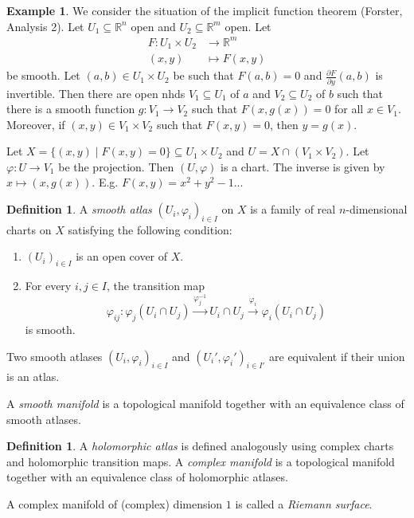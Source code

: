 \documentclass[11pt,A4]{article}
\theoremstyle{plain}
\theoremstyle{definition}
\newtheorem{defn}[thm]{Definition}
\newtheorem{exa}[thm]{Example}
\theoremstyle{remark}
\newcommand{\R}{\mathbb{R}}
\newcommand{\1}{\mathbbm{1}}
\newcommand{\tms}{\times}
\begin{document}
\begin{exa}
    We consider the situation of the implicit function theorem (Forster, Analysis 2).
    Let $U_{1}\subseteq \R^{n}$ open and $U_{2}\subseteq \R^{m}$ open.
    Let
    \begin{align*}
	F\colon U_{1}\times U_{2} &\to \R^{m} \\
	(x,y) &\mapsto F(x,y)
    \end{align*}
    be smooth.
    Let $(a,b)\in U_{1}\times U_{2}$ be such that $F(a,b)=0$ and $\frac{\partial F}{\partial y}(a,b)$ is invertible.
    Then there are open nhds $V_{1}\subseteq U_{1}$ of $a$ and $V_{2}\subseteq U_{2}$ of $b$ such that there is a smooth function $g\colon V_{1}\to V_{2}$ such that $F(x,g(x))=0$ for all $x\in V_{1}$.
    Moreover, if $(x,y)\in V_{1}\times V_{2}$ such that $F(x,y)=0$, then $y=g(x)$.

    Let $X=\{(x,y)\mid F(x,y)=0\} \subseteq U_{1}\times U_{2}$ and $U=X\cap (V_{1}\tms V_{2})$.
    Let $\varphi \colon U\to V_{1}$ be the projection.
    Then $(U,\varphi)$ is a chart.
    The inverse is given by $x\mapsto (x,g(x))$.
    E.g. $F(x,y)=x^{2}+y^{2}-1$...
\end{exa}

\begin{defn}
    A \textit{smooth atlas} $(U_{i},\varphi_{i})_{i\in I}$ on $X$ is a family of real $n$-dimensional charts on $X$ satisfying the following condition:
    \begin{enumerate}[label=\arabic*)]
	\item $(U_{i})_{i\in I}$ is an open cover of $X$.
	\item For every $i,j\in I$, the transition map
	    \[\varphi_{ij}\colon \varphi_{j}(U_{i}\cap U_{j})\xrightarrow{\varphi_{j}^{-1}} U_{i}\cap U_{j}\xrightarrow{\varphi_{i}} \varphi_{i}(U_{i}\cap U_{j}) \]
	    is smooth.
    \end{enumerate}
    Two smooth atlases $(U_{i},\varphi_{i})_{i\in I}$ and $(U_{i}',\varphi_{i}')_{i\in I'}$ are equivalent if their union is an atlas.

    A \textit{smooth manifold} is a topological manifold together with an equivalence class of smooth atlases.
\end{defn}

\begin{defn}
    A \textit{holomorphic atlas} is defined analogously using complex charts and holomorphic transition maps.
    A \textit{complex manifold} is a topological manifold together with an equivalence class of holomorphic atlases.

    A complex manifold of (complex) dimension $1$ is called a \textit{Riemann surface}.
\end{defn}
\end{document}
